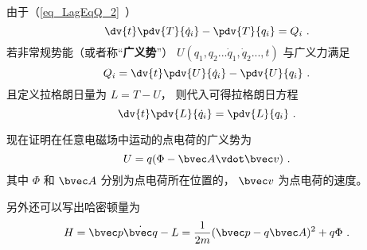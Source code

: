 

由于（\autoref{eq_LagEqQ_2}~）
\begin{equation}
\dv{t}\pdv{T}{\dot q_i} - \pdv{T}{q_i} = Q_i~.
\end{equation}
若非常规势能（或者称“\textbf{广义势}”）  $U(q_1, q_2...\dot q_1, \dot q_2..., t)$ 与广义力满足
\begin{equation}\label{eq_EMLagP_2}
Q_i = \dv{t} \pdv{U}{\dot q_i} - \pdv{U}{q_i}~.
\end{equation}
且定义拉格朗日量为 $L = T - U$， 则代入可得拉格朗日方程
\begin{equation}
\dv{t} \pdv{L}{\dot q_i} = \pdv{L}{q_i}~.
\end{equation}

现在证明在任意电磁场中运动的点电荷的广义势为
\begin{equation}\label{eq_EMLagP_4}
U = q(\Phi  - \bvec A \vdot \bvec v)~.
\end{equation}
其中 $\Phi$ 和 $\bvec A$ 分别为点电荷所在位置的， $\bvec v$ 为点电荷的速度。

另外还可以写出哈密顿量为
\begin{equation}\label{eq_EMLagP_3}
H = \bvec p \dot{\bvec q} - L = \frac{1}{2m}(\bvec p - q\bvec A)^2 + q\Phi~.
\end{equation}

